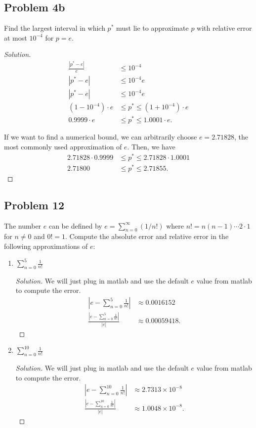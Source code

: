 \documentclass{article}
\begin{document}
\subsection*{Problem 4b}
Find the largest interval in which $p^*$ must lie to approximate $p$ with relative error at most 
$10^{-4}$ for $p = e$.
\begin{proof}[Solution]
    \begin{align*}
        \frac{|p^*-e|}{e} & \le 10^{-4} \\
        |p^*-e| & \le 10^{-4}e \\
        |p^* - e| & \le 10^{-4}e \\
        (1-10^{-4})\cdot e & \le p^* \le (1+10^{-4})\cdot e \\
        0.9999\cdot e & \le p^* \le 1.0001\cdot e.
    \end{align*}

    If we want to find a numerical bound, we can arbitrarily choose $e = 2.71828$, the most commonly 
    used approximation of $e$. Then, we have 
    \begin{align*}
        2.71828\cdot 0.9999 & \le p^* \le 2.71828\cdot 1.0001 \\
        2.71800 & \le p^* \le 2.71855.
    \end{align*}

\end{proof}

\subsection*{Problem 12}
The number $e$ can be defined by $e = \sum^\infty_{n=0}(1/n!)$ where 
$n! = n(n-1)\cdots 2\cdot 1$
for $n\neq 0$ and $0! = 1$.
Compute the absolute error and relative error in the following approximations of $e$:
\begin{enumerate}[label=\alph*.]
    \item $\sum\limits^5_{n=0}\frac{1}{n!}$
    \begin{proof}[Solution]
        We will just plug in matlab and use the default $e$ value from matlab to compute the error.
        \begin{align*}
            |e - \sum\limits_{n=0}^{5}\frac{1}{n!}| & \approx 0.0016152 \\
            \frac{|e - \sum\limits_{n=0}^{5}\frac{1}{n!}|}{|e|} & \approx 0.00059418.
        \end{align*}
    \end{proof}
    
    \item $\sum\limits^{10}_{n=0}\frac{1}{n!}$
    \begin{proof}[Solution]
        We will just plug in matlab and use the default $e$ value from matlab to compute the error.
        \begin{align*}
            |e - \sum\limits_{n=0}^{10}\frac{1}{n!}| & \approx 2.7313 \times 10^{-8} \\
            \frac{|e - \sum\limits_{n=0}^{10}\frac{1}{n!}|}{|e|} & \approx 1.0048 \times 10^{-8}.
        \end{align*}
    \end{proof}
\end{enumerate}
\end{document}
